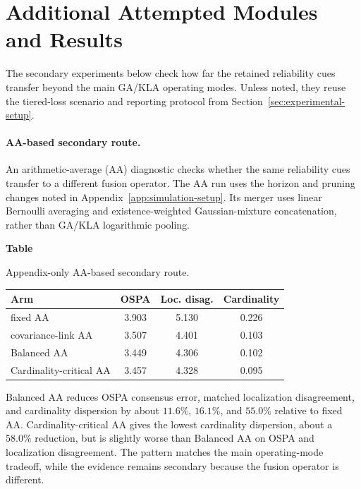 \section{Additional Attempted Modules and Results}
\label{app:additional-modules}

The secondary experiments below check how far the retained reliability cues transfer beyond the main GA/KLA operating modes. Unless noted, they reuse the tiered-loss scenario and reporting protocol from Section~\ref{sec:experimental-setup}.

\paragraph{AA-based secondary route.}

An arithmetic-average (AA) diagnostic checks whether the same reliability cues transfer to a different fusion operator. The AA run uses the horizon and pruning changes noted in Appendix~\ref{app:simulation-setup}. Its merger uses linear Bernoulli averaging and existence-weighted Gaussian-mixture concatenation, rather than GA/KLA logarithmic pooling.

\par\medskip
{}\label{tab:appendix-aa}
\noindent\begin{minipage}{\linewidth}
  \noindent\textbf{Table~\thetable}\par
  \noindent Appendix-only AA-based secondary route.\par\smallskip
  \centering
  \begin{tabular}{lccc}
    \toprule
    Arm & OSPA & Loc. disag. & Cardinality \\
    \midrule
    fixed AA & 3.903 & 5.130 & 0.226 \\
    covariance-link AA & 3.507 & 4.401 & 0.103 \\
    Balanced AA & 3.449 & 4.306 & 0.102 \\
    Cardinality-critical AA & 3.457 & 4.328 & 0.095 \\
    \bottomrule
  \end{tabular}
\end{minipage}
\par\medskip

Balanced AA reduces OSPA consensus error, matched localization disagreement, and cardinality dispersion by about $11.6\%$, $16.1\%$, and $55.0\%$ relative to fixed AA. Cardinality-critical AA gives the lowest cardinality dispersion, about a $58.0\%$ reduction, but is slightly worse than Balanced AA on OSPA and localization disagreement. The pattern matches the main operating-mode tradeoff, while the evidence remains secondary because the fusion operator is different.

